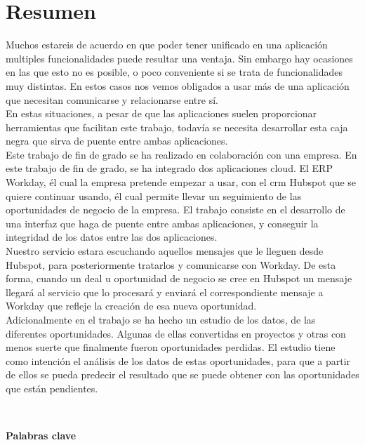 \chapter*{Resumen}
	
	Muchos estareis de acuerdo en que poder tener unificado en una aplicación multiples funcionalidades puede resultar una ventaja.
	Sin embargo hay ocasiones en las que esto no es posible, o poco conveniente si se trata de funcionalidades muy distintas.
	En estos casos nos vemos obligados a usar más de una aplicación que necesitan comunicarse y relacionarse entre sí.\\
	
	En estas situaciones, a pesar de que las aplicaciones suelen proporcionar herramientas que facilitan este trabajo, todavía se necesita desarrollar esta
	caja negra que sirva de puente entre ambas aplicaciones.\\
	
	Este trabajo de fin de grado se ha realizado en colaboración con una empresa.
	En este trabajo de fin de grado, se ha integrado dos aplicaciones cloud. El ERP Workday, él cual la empresa pretende empezar a usar,
	con el \gls{crm} Hubspot que se quiere continuar usando, él cual permite llevar un seguimiento de las oportunidades de negocio de la empresa.
	El trabajo consiste en el desarrollo de una interfaz que haga de puente entre ambas aplicaciones, 
	y conseguir la integridad de los datos entre las dos aplicaciones. \\
	
	
	Nuestro servicio estara escuchando aquellos mensajes que le lleguen desde Hubspot, para posteriormente tratarlos y comunicarse con Workday.
	De esta forma, cuando un deal u oportunidad de negocio se cree en Hubspot un mensaje llegará al servicio que lo procesará y enviará el correspondiente
	mensaje a Workday que refleje la creación de esa nueva oportunidad.\\
	
	
	Adicionalmente en el trabajo se ha hecho un estudio de los datos, de las diferentes oportunidades. Algunas de ellas convertidas en proyectos y otras con
	menos suerte que finalmente fueron oportunidades perdidas. El estudio tiene como intención el análisis de los datos de estas oportunidades,
	para que a partir de ellos se pueda predecir el resultado que se puede obtener con las oportunidades que están pendientes. 

	\
	
	\textbf{Palabras clave}
    
